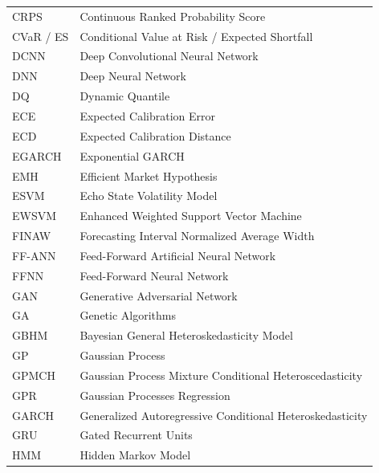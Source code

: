 \begin{table}[H]
\begin{subtable}[t]{0.49\textwidth}
\begin{tabular}{lp{}}
        CRPS & Continuous Ranked Probability Score \\
        CVaR / ES & Conditional Value at Risk / Expected Shortfall \\
        DCNN & Deep Convolutional Neural Network \\
        DNN & Deep Neural Network \\
        DQ & Dynamic Quantile \\
        ECE & Expected Calibration Error \\
        ECD & Expected Calibration Distance \\
        EGARCH & Exponential GARCH \\
        EMH & Efficient Market Hypothesis \\
        ESVM & Echo State Volatility Model \\
        EWSVM & Enhanced Weighted Support Vector Machine \\
        FINAW & Forecasting Interval Normalized Average Width \\
        FF-ANN & Feed-Forward Artificial Neural Network \\
        FFNN & Feed-Forward Neural Network \\
        GAN & Generative Adversarial Network \\
        GA & Genetic Algorithms \\
        GBHM & Bayesian General Heteroskedasticity Model \\
        GP & Gaussian Process \\
        GPMCH & Gaussian Process Mixture Conditional Heteroscedasticity \\
        GPR & Gaussian Processes Regression \\
        GARCH & Generalized Autoregressive Conditional Heteroskedasticity \\
        GRU & Gated Recurrent Units \\
        HMM & Hidden Markov Model \\
        

\end{tabular}
\end{subtable}
\end{table}

